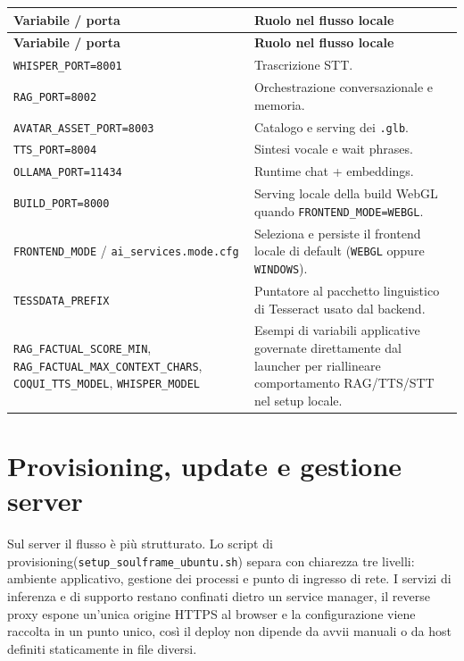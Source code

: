 \par\begingroup
\scriptsize
\setlength{\LTleft}{0pt}
\setlength{\LTright}{0pt}
\captionsetup{type=table}
\label{tab:appendix-ops-windows-env}
\begin{longtable}{|>{\raggedright\arraybackslash}p{}|>{\raggedright\arraybackslash}p{}|}
\hline
\textbf{Variabile / porta} & \textbf{Ruolo nel flusso locale} \\
\hline
\endfirsthead
\hline
\textbf{Variabile / porta} & \textbf{Ruolo nel flusso locale} \\
\hline
\endhead
\texttt{WHISPER\_PORT=8001} & Trascrizione STT. \\
\hline
\texttt{RAG\_PORT=8002} & Orchestrazione conversazionale e memoria. \\
\hline
\texttt{AVATAR\_ASSET\_PORT=8003} & Catalogo e serving dei \texttt{.glb}. \\
\hline
\texttt{TTS\_PORT=8004} & Sintesi vocale e wait phrases. \\
\hline
\texttt{OLLAMA\_PORT=11434} & Runtime chat + embeddings. \\
\hline
\texttt{BUILD\_PORT=8000} & Serving locale della build WebGL quando \texttt{FRONTEND\_MODE=WEBGL}. \\
\hline
\texttt{FRONTEND\_MODE} / \texttt{ai\_services.mode.cfg} & Seleziona e persiste il frontend locale di default (\texttt{WEBGL} oppure \texttt{WINDOWS}). \\
\hline
\texttt{TESSDATA\_PREFIX} & Puntatore al pacchetto linguistico di Tesseract usato dal backend. \\
\hline
\texttt{RAG\_FACTUAL\_SCORE\_MIN}, \texttt{RAG\_FACTUAL\_MAX\_CONTEXT\_CHARS}, \texttt{COQUI\_TTS\_MODEL}, \texttt{WHISPER\_MODEL} & Esempi di variabili applicative governate direttamente dal launcher per riallineare comportamento RAG/TTS/STT nel setup locale. \\
\hline
\end{longtable}
\par\endgroup

\section{Provisioning, update e gestione server}
{\setlength{\emergencystretch}{6em}\sloppy
Sul server il flusso è più strutturato. Lo script di provisioning\allowbreak (\texttt{setup\_soulframe\_ubuntu.sh}) separa con chiarezza tre livelli: ambiente applicativo, gestione dei processi e punto di ingresso di rete. I servizi di inferenza e di supporto restano confinati dietro un service manager, il reverse proxy espone un'unica origine HTTPS al browser e la configurazione viene raccolta in un punto unico, così il deploy non dipende da avvii manuali o da host definiti staticamente in file diversi.
\par}

